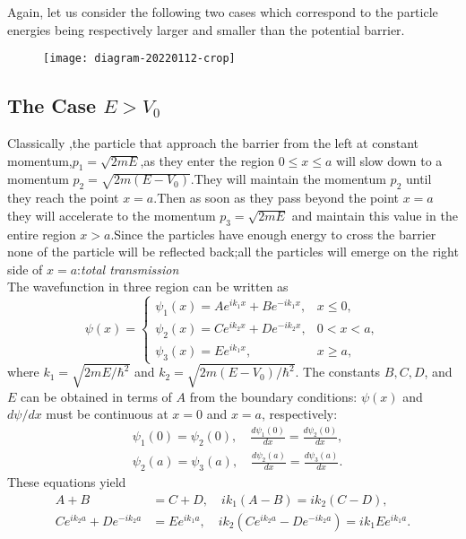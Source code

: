 Again, let us consider the following two cases which correspond to the particle energies being respectively larger and smaller than the potential barrier.\\
\begin{figure}[H]
	\centering
	\texttt{[image: diagram-20220112-crop]}
	\caption{}
	\label{}
\end{figure}
\subsection{The Case $E>V_0$}
Classically ,the particle that approach the barrier from the left at constant momentum,$p_1=\sqrt{2mE}$,as they enter the region $0\leq x \leq a$ will slow down to a momentum $p_2=\sqrt{2m(E-V_0)}$.They will maintain the momentum $p_2$ until they reach the point $x=a$.Then as soon as they pass beyond the point $x=a$ they will accelerate to the momentum $p_3=\sqrt{2mE}$ and maintain this value in the entire region $x>a$.Since the particles have enough energy to cross the barrier none of the particle will be reflected back;all the particles will emerge on the right side of $x=a$:\textit{total transmission}\\
The wavefunction in three region can be written as 
$$\psi(x)= \begin{cases}\psi_{1}(x)=A e^{i k_{1} x}+B e^{-i k_{1} x}, & x \leq 0, \\ \psi_{2}(x)=C e^{i k_{2} x}+D e^{-i k_{2} x}, & 0<x<a, \\ \psi_{3}(x)=E e^{i k_{1} x}, & x \geq a,\end{cases}$$
where $k_{1}=\sqrt{2 m E / \hbar^{2}}$ and $k_{2}=\sqrt{2 m\left(E-V_{0}\right) / \hbar^{2}}$. The constants $B, C, D$, and $E$ can be obtained in terms of $A$ from the boundary conditions: $\psi(x)$ and $d \psi / d x$ must be continuous at $x=0$ and $x=a$, respectively:
$$\begin{aligned}
	&\psi_{1}(0)=\psi_{2}(0), \quad \frac{d \psi_{1}(0)}{d x}=\frac{d \psi_{2}(0)}{d x}, \\
	&\psi_{2}(a)=\psi_{3}(a), \quad \frac{d \psi_{2}(a)}{d x}=\frac{d \psi_{3}(a)}{d x} .
\end{aligned}$$
These equations yield
$$
\begin{aligned}
A+B &=C+D, \quad i k_{1}(A-B)=i k_{2}(C-D), \\
C e^{i k_{2} a}+D e^{-i k_{2} a} &=E e^{i k_{1} a}, \quad i k_{2}\left(C e^{i k_{2} a}-D e^{-i k_{2} a}\right)=i k_{1} E e^{i k_{1} a} .
\end{aligned}
$$
